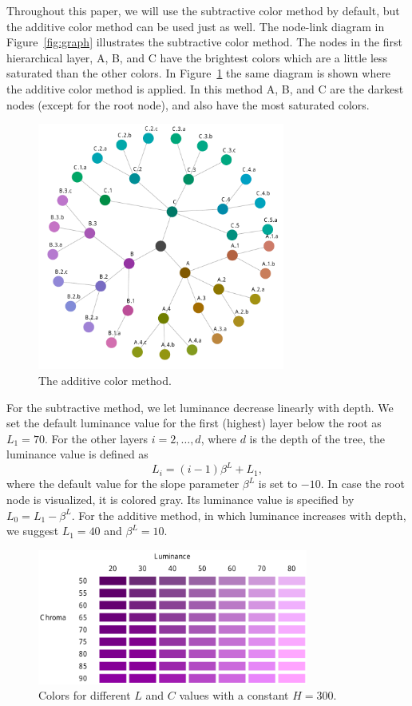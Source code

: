 \documentclass[journal]{vgtc}                %
\begin{document}
Throughout this paper, we will use the subtractive color method by default, but the additive color method can be used just as well. The node-link diagram in Figure~\ref{fig:graph} illustrates the subtractive color method. The nodes in the first hierarchical layer, A, B, and C have the brightest colors which are a little less saturated than the other colors. In Figure~\ref{fig:graphadd} the same diagram is shown where the additive color method is applied. In this method A, B, and C are the darkest nodes (except for the root node), and also have the most saturated colors.

\begin{figure}[tb]
  \centering
  \includegraphics[width=3.2in]{HCPgraph3.pdf}
  \caption{The additive color method.}\label{fig:graphadd}
\end{figure}


For the subtractive method, we let luminance decrease linearly with depth. We set the default luminance value for the first (highest) layer below the root as $L_1=70$. For the other layers $i=2,\ldots, d$, where $d$ is the depth of the tree, the luminance value is defined as
\begin{equation}
L_i=(i-1)\beta^L + L_1,
\end{equation}
where the default value for the slope parameter $\beta^L$ is set to $-10$. In case the root node is visualized, it is colored gray. Its luminance value is specified by $L_0=L_1-\beta^L$. For the additive method, in which luminance increases with depth, we suggest $L_1=40$ and $\beta^L=10$. 

\begin{figure}[!b]
  \centering
  \includegraphics[width=3.5in]{LC.pdf}
  \caption{Colors for different $L$ and $C$ values with a constant $H=300$.}\label{fig:lc}
  \vspace{-1ex}
\end{figure}
\end{document}
